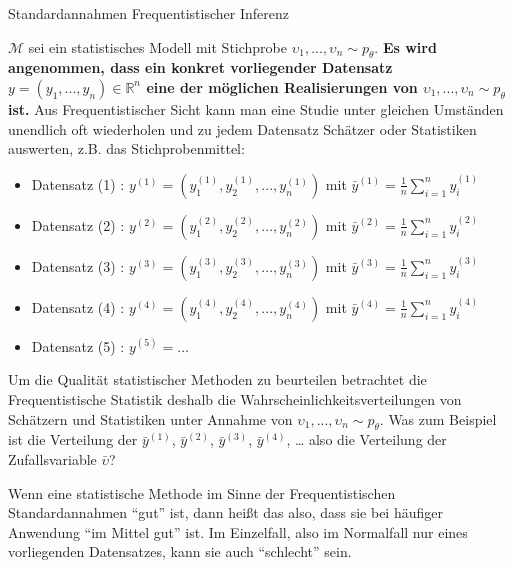\documentclass[
  8pt,
  ignorenonframetext,
]{beamer}
\newcommand{\ups} {\upsilon}
\begin{document}
\begin{frame}{}
\protect\hypertarget{section-4}{}
Standardannahmen Frequentistischer Inferenz

\footnotesize

\(\mathcal{M}\) sei ein statistisches Modell mit Stichprobe
\(\ups_1,...,\ups_n \sim p_\theta\). \textbf{Es wird angenommen, dass
ein konkret vorliegender Datensatz
\(y = (y_1,...,y_n) \in \mathbb{R}^n\) eine der möglichen Realisierungen
von \(\ups_1,...,\ups_n \sim p_\theta\) ist.} Aus Frequentistischer
Sicht kann man eine Studie unter gleichen Umständen unendlich oft
wiederholen und zu jedem Datensatz Schätzer oder Statistiken auswerten,
z.B. das Stichprobenmittel:

\footnotesize
\begin{itemize}
\item[] Datensatz (1) : $y^{(1)} = \left(y_1^{(1)}, y_2^{(1)}, ...,y_n^{(1)}\right)$
                        mit $\bar{y}^{(1)} = \frac{1}{n}\sum_{i=1}^n y_i^{(1)}$
\item[] Datensatz (2) : $y^{(2)} = \left(y_1^{(2)}, y_2^{(2)}, ...,y_n^{(2)}\right)$
                        mit $\bar{y}^{(2)} = \frac{1}{n}\sum_{i=1}^n y_i^{(2)}$
\item[] Datensatz (3) : $y^{(3)} = \left(y_1^{(3)}, y_2^{(3)}, ...,y_n^{(3)}\right)$
                        mit $\bar{y}^{(3)} = \frac{1}{n}\sum_{i=1}^n y_i^{(3)}$
\item[] Datensatz (4) : $y^{(4)} = \left(y_1^{(4)}, y_2^{(4)}, ...,y_n^{(4)}\right)$
                        mit $\bar{y}^{(4)} = \frac{1}{n}\sum_{i=1}^n y_i^{(4)}$
\item[] Datensatz (5) : $y^{(5)} = ...$
\end{itemize}

Um die Qualität statistischer Methoden zu beurteilen betrachtet die
Frequentistische Statistik deshalb die Wahrscheinlichkeitsverteilungen
von Schätzern und Statistiken unter Annahme von
\(\ups_1,...,\ups_n \sim p_\theta\). Was zum Beispiel ist die Verteilung
der \(\bar{y}^{(1)}\), \(\bar{y}^{(2)}\), \(\bar{y}^{(3)}\),
\(\bar{y}^{(4)}\), \ldots{} also die Verteilung der Zufallsvariable
\(\bar{\ups}\)?

Wenn eine statistische Methode im Sinne der Frequentistischen
Standardannahmen ``gut'' ist, dann heißt das also, dass sie bei häufiger
Anwendung ``im Mittel gut'' ist. Im Einzelfall, also im Normalfall nur
eines vorliegenden Datensatzes, kann sie auch ``schlecht'' sein.
\end{frame}
\end{document}
